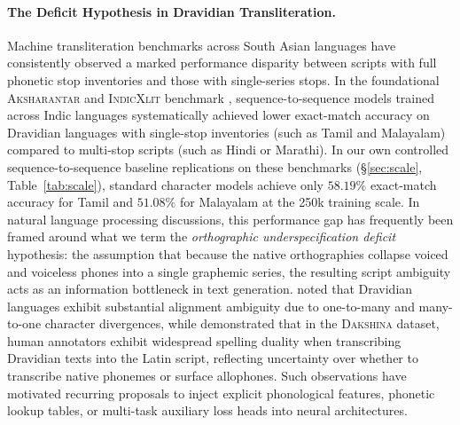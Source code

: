 \documentclass[11pt]{article}
\begin{document}
\paragraph{The Deficit Hypothesis in Dravidian Transliteration.}
Machine transliteration benchmarks across South Asian languages have consistently observed a marked performance disparity between scripts with full phonetic stop inventories and those with single-series stops. In the foundational \textsc{Aksharantar} and \textsc{IndicXlit} benchmark \cite{madhani-etal-2023-aksharantar}, sequence-to-sequence models trained across Indic languages systematically achieved lower exact-match accuracy on Dravidian languages with single-stop inventories (such as Tamil and Malayalam) compared to multi-stop scripts (such as Hindi or Marathi). In our own controlled sequence-to-sequence baseline replications on these benchmarks (\S\ref{sec:scale}, Table~\ref{tab:scale}), standard character models achieve only $58.19\%$ exact-match accuracy for Tamil and $51.08\%$ for Malayalam at the 250k training scale. In natural language processing discussions, this performance gap has frequently been framed around what we term the \emph{orthographic underspecification deficit} hypothesis: the assumption that because the native orthographies collapse voiced and voiceless phones into a single graphemic series, the resulting script ambiguity acts as an information bottleneck in text generation. \citet{madhani-etal-2023-aksharantar} noted that Dravidian languages exhibit substantial alignment ambiguity due to one-to-many and many-to-one character divergences, while \citet{roark-etal-2020-processing} demonstrated that in the \textsc{Dakshina} dataset, human annotators exhibit widespread spelling duality when transcribing Dravidian texts into the Latin script, reflecting uncertainty over whether to transcribe native phonemes or surface allophones. Such observations have motivated recurring proposals to inject explicit phonological features, phonetic lookup tables, or multi-task auxiliary loss heads into neural architectures.
\end{document}
